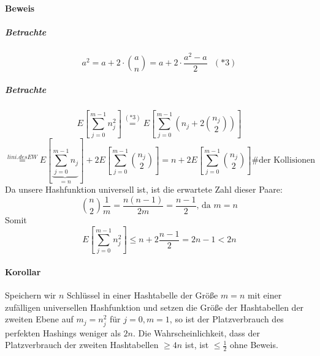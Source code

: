 \paragraph{Beweis}
\subparagraph{Betrachte}
\[ a^2= a+2\cdot\binom{a}{n}=a+2\cdot\frac{a^2-a}{2}~~~(*3) \]
\subparagraph{Betrachte}
\[ E\left[ \sum_{j=0}^{m-1} n_j^2\right] \overset{(*3)}{=} E \left[ \sum_{j=0}^{m-1} \left(n_j+2\binom{n_j}{2}\right) \right] \]
\[ \overset{lini. des EW}{=} E \left[ \underset{=n}{\underbrace{\sum_{j=0}^{m-1}n_j}} \right]+2E\left[ \sum_{j=0}^{m-1}\binom{n_j}{2} \right]=n+2E\left[ \sum_{j=0}^{m-1} \binom{n_j}{2}\right] \text{\# der Kollisionen}\]
Da unsere Hashfunktion universell ist, ist die erwartete Zahl dieser Paare:
\[ \binom{n}{2}\frac{1}{m}=\frac{n(n-1)}{2m}=\frac{n-1}{2}\text{, da }m=n \]
Somit
\[ E\left[ \sum_{j=0}^{m-1} n_j^2\right] \leq n+2\frac{n-1}{2}=2n-1<2n \]
\paragraph{Korollar}
Speichern wir $n$ Schlüssel in einer Hashtabelle der Größe $m=n$ mit einer zufälligen universellen Hashfunktion und setzen die Größe der Hashtabellen der zweiten Ebene auf $m_j=n_j^2$ für $j=0, m=1$, so ist der Platzverbrauch des perfekten Hashings weniger als $2n$. Die Wahrscheinlichkeit, dass der Platzverbrauch der zweiten Hashtabellen $\geq 4n$ ist, ist $\leq \frac{1}{2}$ ohne Beweis.